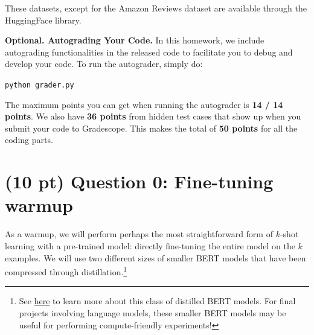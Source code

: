\documentclass[12pt]{article}
\begin{document}
    These datasets, except for the Amazon Reviews dataset are available through the HuggingFace library.

    \vspace{0.2cm}
    \noindent\textbf{Optional. Autograding Your Code.}
    In this homework, we include autograding functionalities in the released code to facilitate you to debug and develop your code. To run the autograder, simply do:

    \texttt{python grader.py}

    \noindent The maximum points you can get when running the autograder is \textbf{14 / 14 points}. We also have \textbf{36 points} from hidden test cases that show up when you submit your code to Gradescope. This makes the total of \textbf{50 points} for all the coding parts.

    \section*{(10 pt) Question 0: Fine-tuning warmup}
    As a warmup, we will perform perhaps the most straightforward form of $k$-shot learning with a pre-trained model: directly fine-tuning the entire model on the $k$ examples. We will use two different sizes of smaller BERT models that have been compressed through distillation.\footnote{See \href{https://arxiv.org/pdf/1908.08962.pdf}{here} to learn more about this class of distilled BERT models. For final projects involving language models, these smaller BERT models may be useful for performing compute-friendly experiments!}
\end{document}
